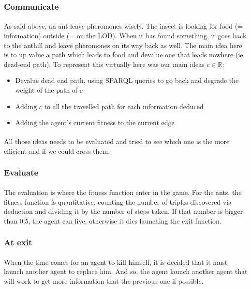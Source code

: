 \documentclass{article}
\newenvironment{itemh}[0]{\begin{itemize}[label=$\heartsuit$, font=\color{mygray} \small]}{\end{itemize}}
\begin{document}
		\subsubsection{Communicate}
			\paragraph{}
				As said above, an ant leave pheromones wisely.
				The insect is looking for food (= information) outside (= on the LOD).
				When it has found something, it goes back to the anthill and leave pheromones on its way back as well.
				The main idea here is to up value a path which leads to food and devalue one that leads nowhere (ie dead-end path).
				To represent this virtually here was our main ideas $c \in \mathbb{R}$:
			\begin{itemh}
			\item Devalue dead end path, using SPARQL queries to go back and degrade the weight of the path of $c$
			\item Adding $c$ to all the travelled path for each information deduced
			\item Adding the agent's current fitness to the current edge
			\end{itemh}
			\paragraph{}
				All those ideas needs to be evaluated and tried to see which one is the more efficient and if we could cross them.
		\subsubsection{Evaluate}
			\paragraph{}
				The evaluation is where the fitness function enter in the game.
				For the ants, the fitness function is quantitative,
				counting the number of triples discovered via deduction and dividing it by the number of steps taken.
				If that number is bigger than 0.5, the agent can live, otherwise it dies launching the exit function.
		\subsubsection{At exit}
			\paragraph{}
				When the time comes for an agent to kill himself, it is decided that it must launch another agent to replace him.
				And so, the agent launch another agent that will work to get more information that the previous one if possible.
\end{document}
